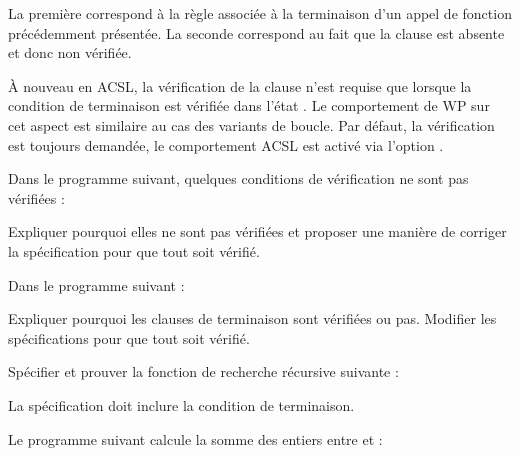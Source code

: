 

La première correspond à la règle associée à la terminaison d'un appel de
fonction précédemment présentée. La seconde correspond au fait que la clause
 est absente et donc non vérifiée.


À nouveau en ACSL, la vérification de la clause  n'est
requise que lorsque la condition de terminaison est vérifiée dans l'état
. Le comportement de WP sur cet aspect est similaire au cas
des variants de boucle. Par défaut, la vérification est toujours demandée, le
comportement ACSL est activé via l'option
.








Dans le programme suivant, quelques conditions de vérification ne sont pas
vérifiées :




Expliquer pourquoi elles ne sont pas vérifiées et proposer une manière de
corriger la spécification pour que tout soit vérifié.






Dans le programme suivant :




Expliquer pourquoi les clauses de terminaison sont vérifiées ou pas. Modifier
les spécifications pour que tout soit vérifié.






Spécifier et prouver la fonction de recherche récursive suivante :




La spécification doit inclure la condition de terminaison.






Le programme suivant calcule la somme des entiers entre  et
 :


